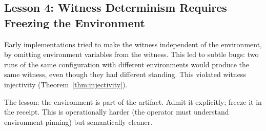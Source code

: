 \subsection{Lesson 4: Witness Determinism Requires Freezing the Environment}

Early implementations tried to make the witness independent of the environment, by omitting environment variables from the witness. This led to subtle bugs: two runs of the same configuration with different environments would produce the same witness, even though they had different standing. This violated witness injectivity (Theorem~\ref{thm:injectivity}).

The lesson: the environment is part of the artifact. Admit it explicitly; freeze it in the receipt. This is operationally harder (the operator must understand environment pinning) but semantically cleaner.
